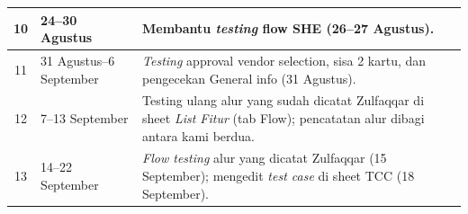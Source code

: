 \begin{center}
\begin{longtable}{|c|p{3.3cm}|p{7.5cm}|}
\hline
10 & 24--30 Agustus & Membantu \textit{testing} flow SHE (26--27 Agustus). \\
\hline
11 & 31 Agustus--6 September & \textit{Testing} approval vendor selection, sisa 2 kartu, dan pengecekan General info (31 Agustus). \\
\hline
12 & 7--13 September & Testing ulang alur yang sudah dicatat Zulfaqqar di sheet \textit{List Fitur} (tab Flow); pencatatan alur dibagi antara kami berdua. \\
\hline
13 & 14--22 September & \textit{Flow testing} alur yang dicatat Zulfaqqar (15 September); mengedit \textit{test case} di sheet TCC (18 September). \\
\hline
\end{longtable}
\end{center}
